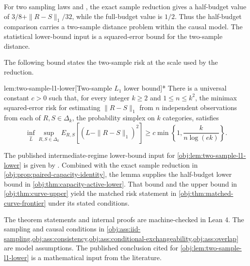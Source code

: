 For two sampling laws  and , the exact sample reduction gives a half-budget value of \(3/8+\|R-S\|_1/32\), while the full-budget value is \(1/2\). Thus the half-budget comparison carries a two-sample distance problem within the causal model. The statistical lower-bound input is a squared-error bound for the two-sample distance.

The following bound states the two-sample risk at the scale used by the reduction.

\begin{lemmav}{lem:two-sample-l1-lower}[Two-sample \(L_1\) lower bound]*
There is a universal constant \(c>0\) such that, for every integer \(k\geq 2\) and \(1\leq n\leq k^2\), the minimax squared-error risk for estimating \(\|R-S\|_1\) from \(n\) independent observations from each of \(R,S\in\Delta_k\), the probability simplex on \(k\) categories, satisfies
\[
\inf_{\widehat L}\sup_{R,S\in\Delta_k}
E_{R,S}\!\left[(\widehat L-\|R-S\|_1)^2\right]
\geq c\min\left\{1,\frac{k}{n\log(ek)}\right\}.
\]
\end{lemmav}

The published intermediate-regime lower-bound input for \cref{obj:lem:two-sample-l1-lower} is given by \citet[Theorem 3 and the unknown-both-distributions reduction following Theorem 6]{JiaoHanWeissman2018}. Combined with the exact sample reduction in \cref{obj:prop:paired-capacity-identity}, the lemma supplies the half-budget lower bound in \cref{obj:thm:capacity-active-lower}. That bound and the upper bound in \cref{obj:thm:curve-upper} yield the matched risk statement in \cref{obj:thm:matched-curve-frontier} under its stated conditions.

The theorem statements and internal proofs are machine-checked in Lean 4. The sampling and causal conditions in \cref{obj:ass:iid-sampling,obj:ass:consistency,obj:ass:conditional-exchangeability,obj:ass:overlap} are model assumptions. The published conclusion cited for \cref{obj:lem:two-sample-l1-lower} is a mathematical input from the literature.
